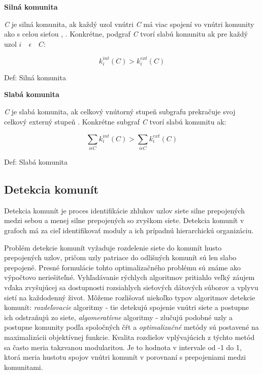 \documentclass[slovak,master,public,dept460,male,cpdeclaration,oneside]{diploma}
\begin{document}
\begin{description}
\item \textbf{Silná komunita}


\textit{C} je silná komunita, ak každý uzol vnútri \textit{C} má viac spojení vo vnútri komunity ako s celou sieťou \cite{flake2000efficient}, \cite{radicchi2004defining}. Konkrétne, podgraf \textit{C} tvorí slabú komunitu ak pre každý uzol \textit{$i\quad \epsilon \quad C$}: 


\begin{mycapequ}[!ht]
      \begin{equation*}
    k_{i}^{int}(C) > k_{i}^{ext}(C)
   \end{equation*}
   \caption{Def: Silná komunita \cite{barabasi2016network}}
\end{mycapequ}

\newpage

\item \textbf{Slabá komunita}


\textit{C} je slabá komunita, ak celkový vnútorný stupeň subgrafu prekračuje svoj celkový externý stupeň \cite{radicchi2004defining}. Konkrétne subgraf \textit{C} tvorí slabú komunitu ak:


\begin{mycapequ}[!ht]
      \begin{equation*}
    \sum_{i \epsilon C} k_{i}^{int} (C) > \sum_{i \epsilon C} k_{i}^{ext} (C)
   \end{equation*}
   \caption{Def: Slabá komunita \cite{barabasi2016network}}
\end{mycapequ}

\end{description}


\subsection{Detekcia komunít}
Detekcia komunít je proces identifikácie zhlukov uzlov siete silne prepojených medzi sebou a menej silne prepojených so zvyškom siete. Detekcia komunít v grafoch má za cieľ identifikovať moduly a ich prípadnú hierarchickú organizáciu.


Problém detekcie komunít vyžaduje  rozdelenie siete do komunít husto prepojených uzlov, pričom uzly patriace do odlišných komunít sú len slabo prepojené. Presné formulácie tohto optimalizačného problému sú známe ako výpočtovo neriešiteľné. Vyhľadávanie rýchlych algoritmov pritiahlo veľký záujem vďaka zvyšujúcej sa dostupnosti rozsiahlych sieťových dátových súborov a vplyvu sietí na každodenný život. Môžeme rozlišovať niekoľko typov algoritmov detekcie komunít: \textit{rozdeľovacie} algoritmy - tie detekujú spojenie vnútri siete a postupne ich odstraňujú zo siete, \textit{algomeratívne} algoritmy - zlučujú podobné uzly a postupne komunity podľa spoločných čŕt a \textit{optimalizačné} metódy sú postavené na maximalizácii objektívnej funkcie. Kvalita rozdielov vplývajúcich z týchto metód sa často meria takzvanou modularitou. Je to hodnota v intervale od -1 do 1, ktorá meria hustotu spojov vnútri komunít v porovnaní s prepojeniami medzi komunitami. 
\end{document}
